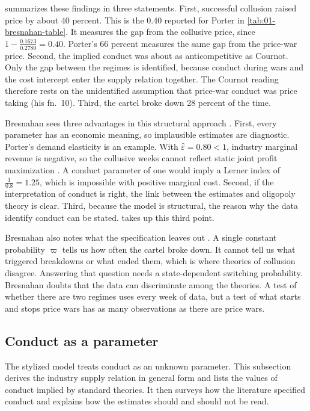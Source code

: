 \citet[p.~1018]{Bresnahan1989} summarizes these findings in three statements. First, successful collusion raised
price by about 40 percent. This is the 0.40 reported for Porter in \cref{tab:01-bresnahan-table}. It measures the gap
from the collusive price, since $1 - \frac{0.1673}{0.2780} = 0.40$. Porter's 66 percent measures the same gap from
the price-war price. Second, the implied conduct was about as anticompetitive as Cournot. Only the gap between
the regimes is identified, because conduct during wars and the cost intercept enter the supply relation together. The
Cournot reading therefore rests on the unidentified assumption that price-war conduct was price taking (his
fn.~10). Third, the cartel broke down 28 percent of the time.

Bresnahan sees three advantages in this structural approach \citep[p.~1018]{Bresnahan1989}. First, every parameter
has an economic meaning, so implausible estimates are diagnostic. Porter's demand elasticity is an example. With
$\hat\varepsilon = 0.80 < 1$, industry marginal revenue is negative, so the collusive weeks cannot reflect static joint
profit maximization \citep[p.~308]{Porter1983}. A conduct parameter of one would imply a Lerner index of
$\frac{1}{0.8} = 1.25$, which is impossible with positive marginal cost. Second, if the interpretation of conduct is
right, the link between the estimates and oligopoly theory is clear. Third, because the model is structural, the reason
why the data identify conduct can be stated.  takes up this third point.

Bresnahan also notes what the specification leaves out \citep[p.~1025]{Bresnahan1989}. A single constant probability
$\varpi$ tells us how often the cartel broke down. It cannot tell us what triggered breakdowns or what ended them,
which is where theories of collusion disagree. Answering that question needs a state-dependent switching probability.
Bresnahan doubts that the data can discriminate among the theories. A test of whether there are two regimes uses every
week of data, but a test of what starts and stops price wars has as many observations as there are price wars.

\subsection{Conduct as a parameter}\label{sec:01-conduct-parameter}

The stylized model treats conduct as an unknown parameter. This subsection derives the industry supply relation in
general form and lists the values of conduct implied by standard theories. It then surveys how the literature
specified conduct and explains how the estimates should and should not be read.

